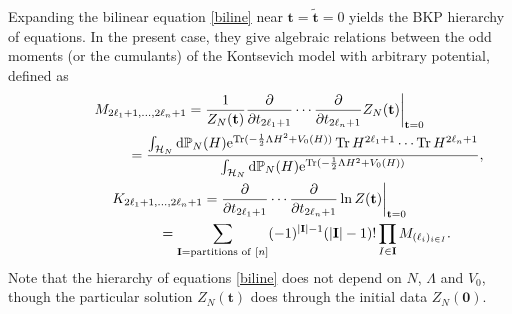 \documentclass[10pt,a4paper]{amsart}
\numberwithin{equation}{section}
\newcommand{\dd}{\mathrm{d}}
\begin{document}
Expanding the bilinear equation \eqref{biline} near $\mathbf{t} = \tilde{\mathbf{t}} = 0$ yields the BKP hierarchy of equations. In the present case, they give algebraic relations between the odd moments (or the cumulants) of the Kontsevich model with arbitrary potential, defined as
\begin{gather*}
M_{2\ell_1 +1 ,\dots,2\ell_n + 1} = \frac{1}{Z_N(\mathbf{t})} \frac{\partial}{\partial t_{2\ell_1 + 1}} \cdots \frac{\partial}{\partial t_{2\ell_n + 1}} Z_N(\mathbf{t}) \bigg|_{\mathbf{t} = 0} \\
\hphantom{M_{2\ell_1 +1 ,\dots,2\ell_n + 1}}{}
 = \frac{\int_{\mathcal{H}_N} \dd\mathbb{P}_N(H) {\rm e}^{{\rm Tr}(-\frac{1}{2}\Lambda H^2 + V_0(H))} \operatorname{Tr}H^{2\ell_1 + 1} \cdots \operatorname{Tr}H^{2\ell_n + 1}}{\int_{\mathcal{H}_N} \dd\mathbb{P}_N(H) {\rm e}^{{\rm Tr}(-\frac{1}{2}\Lambda H^2 + V_0(H))}}, \\
K_{2\ell_1 + 1,\dots,2\ell_n + 1} = \frac{\partial}{\partial t_{2\ell_1 + 1}} \cdots \frac{\partial}{\partial t_{2\ell_n + 1}} \ln Z(\mathbf{t})\bigg|_{\mathbf{t} = 0} \\
\hphantom{K_{2\ell_1 + 1,\dots,2\ell_n + 1}}{}
 = \sum_{\mathbf{I} = {\rm partitions}\,\,{\rm of}\,\,[n]} (-1)^{|\mathbf{I}| - 1}(|\mathbf{I}| - 1)! \prod_{I \in \mathbf{I}} M_{(\ell_i)_{i \in I}}.
\end{gather*}
Note that the hierarchy of equations \eqref{biline} does not depend on $N$, $\Lambda$ and $V_0$, though the particular solution $Z_N(\mathbf{t})$ does through the initial data $Z_N(\mathbf{0})$.
\end{document}
